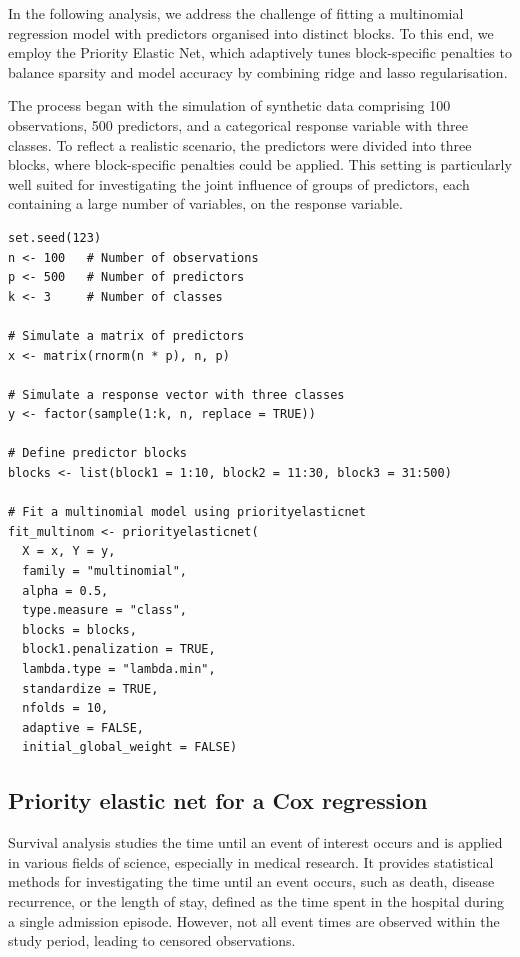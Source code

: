 In the following analysis, we address the challenge of fitting a multinomial regression model with predictors organised into distinct blocks. To this end, we employ the Priority Elastic Net, which adaptively tunes block-specific penalties to balance sparsity and model accuracy by combining ridge and lasso regularisation.

The process began with the simulation of synthetic data comprising 100 observations, 500 predictors, and a categorical response variable with three classes. To reflect a realistic scenario, the predictors were divided into three blocks, where block-specific penalties could be applied. This setting is particularly well suited for investigating the joint influence of groups of predictors, each containing a large number of variables, on the response variable.
{\small
\begin{lstlisting}
set.seed(123)
n <- 100   # Number of observations
p <- 500   # Number of predictors
k <- 3     # Number of classes

# Simulate a matrix of predictors
x <- matrix(rnorm(n * p), n, p)

# Simulate a response vector with three classes
y <- factor(sample(1:k, n, replace = TRUE))

# Define predictor blocks
blocks <- list(block1 = 1:10, block2 = 11:30, block3 = 31:500)

# Fit a multinomial model using priorityelasticnet
fit_multinom <- priorityelasticnet(
  X = x, Y = y,
  family = "multinomial",
  alpha = 0.5,
  type.measure = "class",
  blocks = blocks,
  block1.penalization = TRUE,
  lambda.type = "lambda.min",
  standardize = TRUE,
  nfolds = 10,
  adaptive = FALSE,
  initial_global_weight = FALSE)
\end{lstlisting}
}

\subsection{Priority elastic net for a Cox regression}

Survival analysis studies the time until an event of interest occurs and is applied in various fields of science, especially in medical research. It provides statistical methods for investigating the time until an event occurs, such as death, disease recurrence, or the length of stay, defined as the time spent in the hospital during a single admission episode. However, not all event times are observed within the study period, leading to censored observations.

